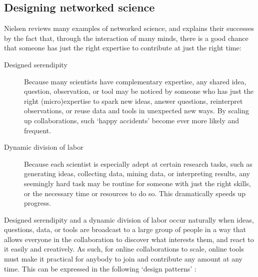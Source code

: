 \documentclass{acmproc-sp}
\begin{document}
\subsection{Designing networked science}
\label{design}
Nielsen \cite{nielsen2012reinventing} reviews many examples of networked science, and explains their successes by the fact that, 
through the interaction of many minds, there is a good chance that someone has just the right expertise to contribute at just the right time:
\begin{description} %
\item[Designed serendipity] Because many scientists have complementary expertise, any shared idea, question, observation, or tool may be noticed by someone who has just the right (micro)expertise to spark new ideas, answer questions, reinterpret observations, or reuse data and tools in unexpected new ways. By scaling up collaborations, such `happy accidents' become ever more likely and frequent.
\item[Dynamic division of labor] Because each scientist is especially adept at certain research tasks, such as generating ideas, collecting data, mining data, or interpreting results, any seemingly hard task may be routine for someone with just the right skills, or the necessary time or resources to do so. This dramatically speeds up progress.
\end{description}


Designed serendipity and a dynamic division of labor occur naturally when ideas, questions, data, or tools are broadcast to a large group of people in a way that allows everyone in the collaboration to discover what interests them, and react to it easily and creatively. As such, for online collaborations to scale, online tools must make it practical for anybody to join and contribute any amount at any time. This can be expressed in the following `design patterns' \cite{nielsen2012reinventing}:
\end{document}
